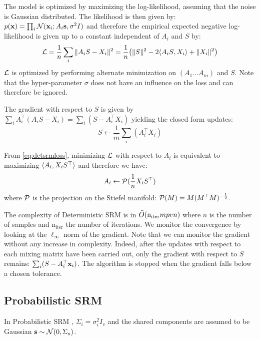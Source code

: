 \documentclass{article}
\begin{document}
The model is optimized by maximizing the log-likelihood, assuming that
the noise is Gaussian distributed.
%
The likelihood is then given by: $p(\mathbf{x}) = \prod_i \mathcal{N}(\mathbf{x}_i; A_i \mathbf{s}, \sigma^2 I)$ and
therefore the empirical expected negative log-likelihood is given up to a constant independent of
$A_i$ and $S$ by:
\begin{align}
  \mathcal{L} = \frac1{n} \sum_i \|A_i S - X_i \|^2 = \frac1{n} \big(\| S \|^2 -2 \langle{ A_i S},{ X_i }\rangle + \| X_i \|^2 \big)
  \label{eq:detsrmloss}
\end{align}
$\mathcal{L}$ is optimized by performing alternate minimization on $(A_1 \dots A_m)$
and $S$.
%
Note that the hyper-parameter $\sigma$ does not have an influence on
the loss and can therefore be ignored.



The gradient with respect to $S$ is given by $\sum_i A_i^{\top}(A_i S -
X_i) = \sum_i (S -
A_i^{\top} X_i)$
yielding the closed form updates:
\begin{equation}
  S \leftarrow  \frac1m \sum_i (A_i^{\top} X_i)
  \label{eq:srm:supdate}
\end{equation}

From \eqref{eq:detsrmloss}, minimizing $\mathcal{L}$ with respect to $A_i$ is
equivalent to maximizing $\langle{ A_i},{ X_i S^{\top} }\rangle$ and therefore we
have:
\begin{equation}
  A_i \leftarrow  \mathcal{P}(\frac1{n}X_i S^{\top})
  \label{eq:detsrm:Aiupdate}
\end{equation}
where $\mathcal{P}$ is the projection on the Stiefel manifold: $\mathcal{P}(M) = M
(M^{\top}M)^{-\frac12}$.
%


The complexity of Deterministic SRM is in $\tilde{O}(\mathrm{n_{iter}} mpvn)$ where
$n$ is the number of samples and $\mathrm{n_{iter}}$ the number of iterations.
%
We monitor the convergence by looking at the $\ell_{\infty}$ norm of the
gradient.
%
Note that we can monitor the gradient without any increase in complexity.
%
Indeed, after the updates with respect to each mixing matrix have been
carried out, only the gradient with respect to $S$ remains: $\sum_i
(S - A_i^{\top}\mathbf{x}_i)$.
%
The algorithm is stopped when the
gradient falls below a chosen tolerance.
%


\subsection{Probabilistic SRM}
\label{sec:probabilisticsrm}
In Probabilistic SRM , $\Sigma_i=\sigma_i^2 I_v$ and the shared
components are assumed to be Gaussian $\mathbf{s} \sim \mathcal{N}(0, \Sigma_s)$.
%
\end{document}
